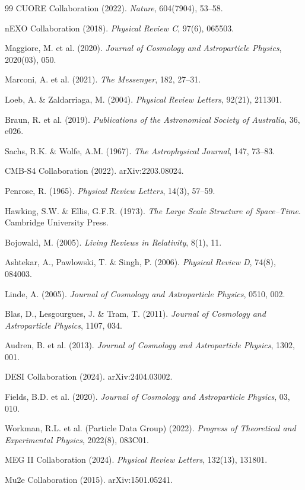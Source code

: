 \documentclass[12pt,a4paper]{book}
\theoremstyle{definition}
\theoremstyle{remark}
\begin{document}
\begin{thebibliography}{99}
 CUORE Collaboration (2022). \textit{Nature}, 604(7904), 53--58.

 nEXO Collaboration (2018). \textit{Physical Review C}, 97(6), 065503.

 Maggiore, M. et al. (2020). \textit{Journal of Cosmology and Astroparticle Physics}, 2020(03), 050.

 Marconi, A. et al. (2021). \textit{The Messenger}, 182, 27--31.

 Loeb, A. \& Zaldarriaga, M. (2004). \textit{Physical Review Letters}, 92(21), 211301.

 Braun, R. et al. (2019). \textit{Publications of the Astronomical Society of Australia}, 36, e026.

 Sachs, R.K. \& Wolfe, A.M. (1967). \textit{The Astrophysical Journal}, 147, 73--83.

 CMB-S4 Collaboration (2022). arXiv:2203.08024.

 Penrose, R. (1965). \textit{Physical Review Letters}, 14(3), 57--59.

 Hawking, S.W. \& Ellis, G.F.R. (1973). \textit{The Large Scale Structure of Space--Time}. Cambridge University Press.

 Bojowald, M. (2005). \textit{Living Reviews in Relativity}, 8(1), 11.

 Ashtekar, A., Pawlowski, T. \& Singh, P. (2006). \textit{Physical Review D}, 74(8), 084003.

 Linde, A. (2005). \textit{Journal of Cosmology and Astroparticle Physics}, 0510, 002.

 Blas, D., Lesgourgues, J. \& Tram, T. (2011). \textit{Journal of Cosmology and Astroparticle Physics}, 1107, 034.

 Audren, B. et al. (2013). \textit{Journal of Cosmology and Astroparticle Physics}, 1302, 001.

 DESI Collaboration (2024). arXiv:2404.03002.

 Fields, B.D. et al. (2020). \textit{Journal of Cosmology and Astroparticle Physics}, 03, 010.

 Workman, R.L. et al. (Particle Data Group) (2022). \textit{Progress of Theoretical and Experimental Physics}, 2022(8), 083C01.

 MEG II Collaboration (2024). \textit{Physical Review Letters}, 132(13), 131801.

 Mu2e Collaboration (2015). arXiv:1501.05241.

\end{thebibliography}
\end{document}
